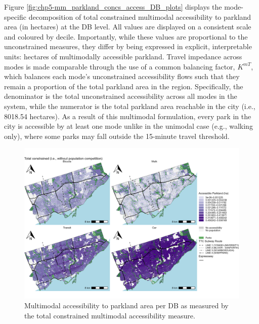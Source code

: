 \documentclass[
11pt, %
oneside, %
english, %
singlespacing, %
]{macthesis} %
\begin{document}
Figure \ref{fig:chp5-mm_parkland_concs_access_DB_plots} displays the mode-specific decomposition of total constrained multimodal accessibility to parkland area (in hectares) at the DB level. All values are displayed on a consistent scale and coloured by decile. Importantly, while these values are proportional to the unconstrained measures, they differ by being expressed in explicit, interpretable units: hectares of multimodally accessible parkland. Travel impedance across modes is made comparable through the use of a common balancing factor, \(K^{mT}\), which balances each mode's unconstrained accessibility flows such that they remain a proportion of the total parkland area in the region. Specifically, the denominator is the total unconstrained accessibility across all modes in the system, while the numerator is the total parkland area reachable in the city (i.e., 8018.54 hectares). As a result of this multimodal formulation, every park in the city is accessible by at least one mode unlike in the unimodal case (e.g., walking only), where some parks may fall outside the 15-minute travel threshold.

\begin{figure}

{\centering \includegraphics[width=6in]{./data/figures/chp5-mm_parkland_total_conc_access_DB_plots} 

}

\caption{\label{fig:chp5-mm_parkland_concs_access_DB_plots}Multimodal accessibility to parkland area per DB as measured by the total constrained multimodal accessibility measure.}\label{fig:unnamed-chunk-76}
\end{figure}
\end{document}
